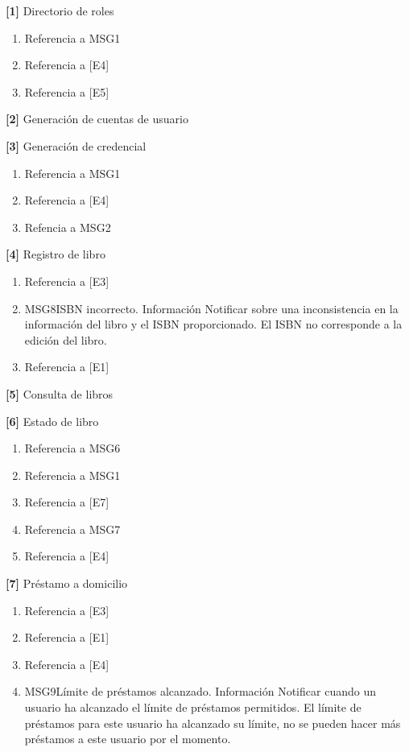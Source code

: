 \begin{Citemize}
	\item {\bf [1]} Directorio de roles
		\begin{enumerate}
			\item Referencia a MSG1
			\item Referencia a [E4]
			\item Referencia a [E5] 
		\end{enumerate}
	\item {\bf [2]} Generación de cuentas de usuario
	\item {\bf [3]} Generación de credencial
		\begin{enumerate}
			\item Referencia a MSG1
			\item Referencia a [E4]
			\item Refencia a MSG2
		\end{enumerate}		 
	\item {\bf [4]} Registro de libro
		\begin{enumerate}
			\item Referencia a [E3]
			\item
			\begin{Message}{MSG8}{ISBN incorrecto.}
				\MSGitem[Tipo: ] Información
				\MSGitem[Objetivo: ] Notificar sobre una inconsistencia en la información del libro y el ISBN proporcionado.
				\MSGitem[Redacción: ] El ISBN no corresponde a la edición del libro.
			\end{Message}
			
			\item Referencia a [E1]	
		\end{enumerate}
	\item {\bf [5]} Consulta de libros
	\item {\bf [6]} Estado de libro
		\begin{enumerate}
			\item Referencia a MSG6
			\item Referencia a MSG1
			\item Referencia a [E7]
			\item Referencia a MSG7
			\item Referencia a [E4]
		\end{enumerate}
	\item {\bf [7]} Préstamo a domicilio
		\begin{enumerate}
			\item Referencia a [E3]
			\item Referencia a [E1]
			\item Referencia a [E4]
			\item
			\begin{Message}{MSG9}{Límite de préstamos alcanzado.}
				\MSGitem[Tipo: ] Información
				\MSGitem[Objetivo: ] Notificar cuando un usuario ha alcanzado el límite de préstamos permitidos.
				\MSGitem[Redacción: ] El límite de préstamos para este usuario ha alcanzado su límite, no se pueden hacer más préstamos a este usuario por el momento.
			\end{Message}
			

\end{enumerate}
\end{Citemize}
